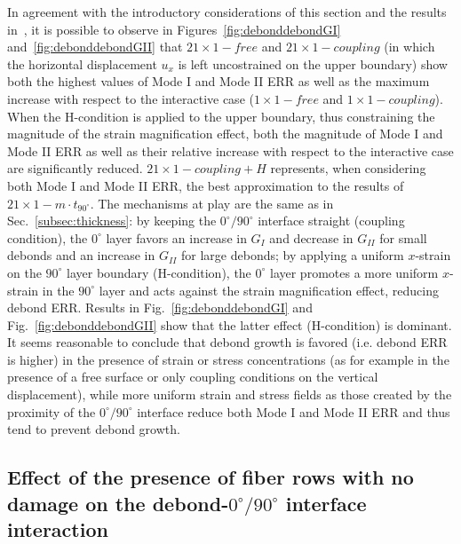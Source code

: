 \documentclass[Review,sagev,times]{sagej}
\begin{document}
In agreement with the introductory considerations of this section and the results in~\cite{DiStasio2019}, it is possible to observe in Figures~\ref{fig:debonddebondGI} and~\ref{fig:debonddebondGII} that $21\times 1-free$ and $21\times 1-coupling$ (in which the horizontal displacement $u_{x}$ is left uncostrained on the upper boundary) show both the highest values of Mode I and Mode II ERR as well as the maximum increase with respect to the interactive case ($1\times 1-free$ and $1\times 1-coupling$). When the H-condition is applied to the upper boundary, thus constraining the magnitude of the strain magnification effect, both the magnitude of Mode I and Mode II ERR as well as their relative increase with respect to the interactive case are significantly reduced. $21\times 1-coupling+H$ represents, when considering both Mode I and Mode II ERR, the best approximation to the results of $21\times 1-m\cdot t_{90^{\circ}}$. The mechanisms at play are the same as in Sec.~\ref{subsec:thickness}: by keeping the $0^{\circ}/90^{\circ}$ interface straight (coupling condition), the $0^{\circ}$ layer favors an increase in $G_{I}$ and decrease in $G_{II}$ for small debonds and an increase in $G_{II}$ for large debonds; by applying a uniform $x$-strain on the $90^{\circ}$ layer boundary (H-condition), the $0^{\circ}$ layer promotes a more uniform $x$-strain in the $90^{\circ}$ layer and acts against the strain magnification effect, reducing debond ERR. Results in Fig.~\ref{fig:debonddebondGI} and Fig.~\ref{fig:debonddebondGII} show that the latter effect (H-condition) is dominant. It seems reasonable to conclude that debond growth is favored (i.e. debond ERR is higher) in the presence of strain or stress concentrations (as for example in the presence of a free surface or only coupling conditions on the vertical displacement), while more uniform strain and stress fields as those created by the proximity of the $0^{\circ}/90^{\circ}$ interface reduce both Mode I and Mode II ERR and thus tend to prevent debond growth.

\subsection{Effect of the presence of fiber rows with no damage on the debond-$0^{\circ}/90^{\circ}$ interface interaction}
\end{document}
